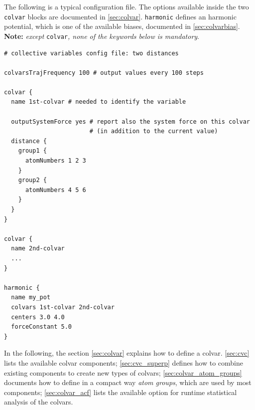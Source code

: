 \begin{itemize}


\end{itemize}

The following is a typical configuration file.  The options available
inside the two \texttt{colvar} blocks are documented in
\ref{sec:colvar}.  \texttt{harmonic} defines an harmonic potential,
which is one of the available biases, documented in
\ref{sec:colvarbias}.  \textbf{Note:} \emph{except
}\texttt{colvar}\emph{, none of the keywords below is mandatory}.
\begin{verbatim}
# collective variables config file: two distances

colvarsTrajFrequency 100 # output values every 100 steps

colvar {
  name 1st-colvar # needed to identify the variable

  outputSystemForce yes # report also the system force on this colvar
                        # (in addition to the current value)
  distance {
    group1 {
      atomNumbers 1 2 3 
    }
    group2 {
      atomNumbers 4 5 6 
    }
  }
}

colvar {
  name 2nd-colvar
  ...
}

harmonic {
  name my_pot
  colvars 1st-colvar 2nd-colvar
  centers 3.0 4.0
  forceConstant 5.0
}
\end{verbatim}

In the following, the section \ref{sec:colvar} explains how to define
a colvar.  \ref{sec:cvc} lists the available colvar components;
\ref{sec:cvc_superp} defines how to combine existing components to
create new types of colvars; \ref{sec:colvar_atom_groups} documents
how to define in a compact way \emph{atom groups}, which are used by
most components; \ref{sec:colvar_acf} lists the available option for
runtime statistical analysis of the colvars.

